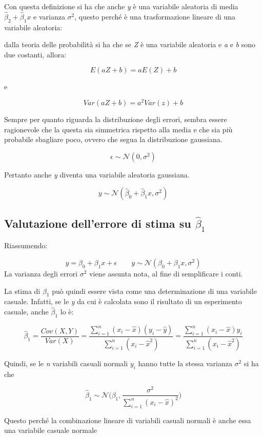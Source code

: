 Con questa definizione si ha che anche \emph{y} è una variabile aleatoria di media $\hat{\beta}_2 + \hat{\beta}_1x$ e varianza $\sigma^2$, questo
perché è una trasformazione lineare di una variabile aleatoria:

dalla teoria delle probabilità si ha che se \textit{Z} è una variabile aleatoria e \textit{a} e \textit{b} sono due costanti, allora:

$$
E(aZ+b) = aE(Z) + b
$$ 

e

$$
Var(aZ+b) = a^2Var(z)+b
$$

Sempre per quanto riguarda la distribuzione degli errori, sembra essere
ragionevole che la questa sia simmetrica rispetto alla media e che sia più probabile
sbagliare poco, ovvero che segua la distribuzione gaussiana.

$$
\epsilon \sim \mathcal{N}(0,\sigma^2)
$$

Pertanto anche \textit{y} diventa una variabile aleatoria gaussiana.

$$
y \sim \mathcal{N}(\hat{\beta}_0 + \hat{\beta}_1 x, \sigma^2)
$$



\subsection{Valutazione dell'errore di stima su $\hat{\beta}_1$}

Riassumendo:

$$
y = \beta_0 + \beta_1 x + \epsilon \qquad y \sim \mathcal{N}(\beta_0 + \beta_1 x, \sigma^2)
$$
La varianza degli errori $\sigma^2$ viene assunta nota, al fine di semplificare i conti.

La stima di $ \beta_1 $ può quindi essere vista come una determinazione di una variabile casuale. Infatti, se le \textit{y} da cui è calcolata sono il risultato di un esperimento casuale, anche $ \hat{\beta}_1 $ lo è:

$$
\hat{\beta}_1 = \frac{Cov(X,Y)}{Var(X)} = \frac{\sum\limits_{i=1}^n (x_i - \hat{x})(y_i - \hat{y})}{\sum\limits_{i=1}^n (x_i - \hat{x}^2)} = \frac{\sum\limits_{i=1}^n (x_i - \hat{x})y_i}{\sum\limits_{i=1}^n (x_i - \hat{x}^2)} 
$$

Quindi, se le \textit{n} variabili casuali normali $ y_i $ hanno tutte la stessa varianza $ \sigma^2 $ si ha che

$$
\hat{\beta}_1 \sim \mathcal{N}\Bigg(\beta_1, \frac{\sigma^2}{\sum_{i=1}^n (x_i - \hat{x})^2}\Bigg)
$$

Questo perché la combinazione lineare di variabili casuali normali è anche essa una variabile casuale normale

